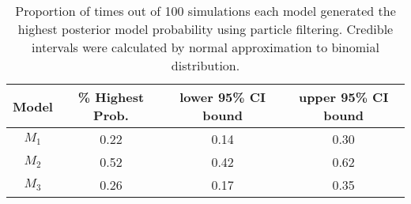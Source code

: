 \documentclass{article}
\begin{document}
\begin{table}
\begin{center}
\caption{Proportion of times out of 100 simulations each model generated the highest posterior model probability using particle filtering. Credible intervals were calculated by normal approximation to binomial distribution.} \label{tab:true.propbestmod}
\begin{tabular}{|c|c|c|c|}
\hline
 Model & \% Highest Prob. & lower 95\% CI bound & upper 95\% CI bound \\
 \hline
 $M_1$ & 0.22 & 0.14 & 0.30 \\
 $M_2$ & 0.52 & 0.42 & 0.62 \\
 $M_3$ & 0.26 & 0.17 & 0.35 \\
 \hline
\end{tabular}
\end{center}
\end{table}

\clearpage



\end{document}
